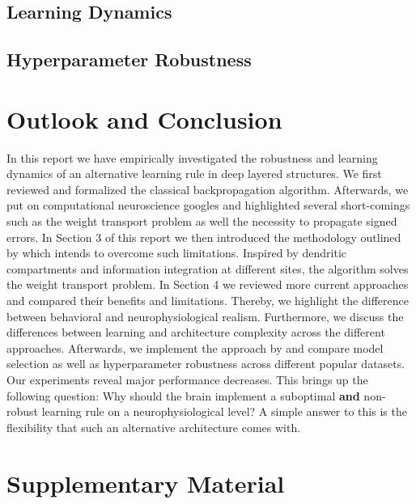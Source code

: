 \documentclass{article}
\theoremstyle{definition}
\begin{document}
\subsection*{Learning Dynamics}

\subsection*{Hyperparameter Robustness}

\newpage
\section{Outlook and Conclusion}

In this report we have empirically investigated the robustness and learning dynamics of an alternative learning rule in deep layered structures.
We first reviewed and formalized the classical backpropagation algorithm. Afterwards, we put on computational neuroscience googles and highlighted several short-comings such as the weight transport problem as well the necessity to propagate signed errors.
In Section 3 of this report we then introduced the methodology outlined by \citet{guerguiev2017} which intends to overcome such limitations. Inspired by dendritic compartments and information integration at different sites, the algorithm solves the weight transport problem.
In Section 4 we reviewed more current approaches and compared their benefits and limitations. Thereby, we highlight the difference between behavioral and neurophysiological realism. Furthermore, we discuss the differences between learning and architecture complexity across the different approaches.
Afterwards, we implement the approach by \citet{guerguiev2017} and compare model selection as well as hyperparameter robustness across different popular datasets. Our experiments reveal major performance decreases. This brings up the following question: Why should the brain implement a suboptimal \textbf{and} non-robust learning rule on a neurophysiological level? A simple answer to this is the flexibility that such an alternative architecture comes with.



\setlength{\bibsep}{4pt plus 0.3ex}

{\footnotesize }

\newpage
\section*{Supplementary Material}


\end{document}
